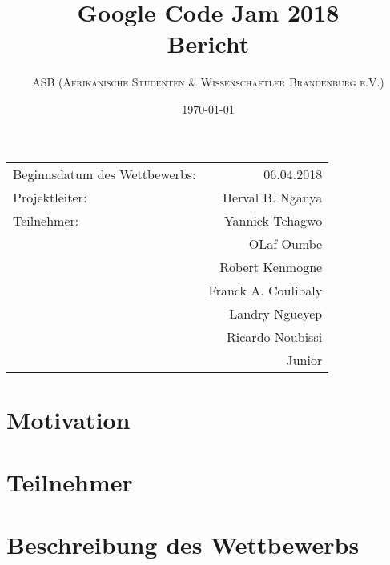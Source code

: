 \documentclass{article}
\title{Google Code Jam 2018 \\ Bericht} %
\author{\textsc{ASB (Afrikanische Studenten \& Wissenschaftler Brandenburg e.V.)}} %
\date{\today} %
\begin{document}
\maketitle %

\begin{center}
\begin{tabular}{l r}
Beginnsdatum des Wettbewerbs: & 06.04.2018 \\ %
Projektleiter: & Herval B. Nganya\\
Teilnehmer: & Yannick Tchagwo \\
& OLaf Oumbe \\
& Robert Kenmogne \\
& Franck A. Coulibaly \\
& Landry Ngueyep \\
& Ricardo Noubissi \\
& Junior
\end{tabular}
\end{center}



\section{Motivation}
 

\section{Teilnehmer}


\section{Beschreibung des Wettbewerbs}
\end{document}
